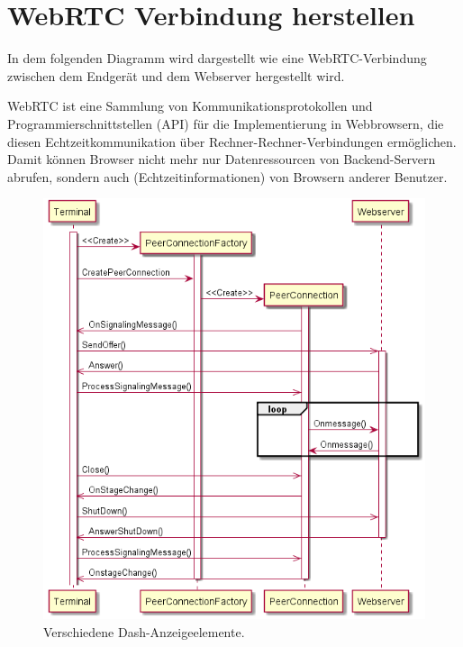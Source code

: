\documentclass[entwurf.tex]{subfiles}
\begin{document}
  	\section{WebRTC Verbindung herstellen}
  	\label{Sequence:WebRTCConnect}
		In dem folgenden Diagramm wird dargestellt wie eine WebRTC-Verbindung zwischen dem Endgerät und dem Webserver hergestellt wird.
		
		WebRTC ist eine Sammlung von Kommunikationsprotokollen und Programmierschnittstellen (API) für die Implementierung in Webbrowsern, die diesen Echtzeitkommunikation über Rechner-Rechner-Verbindungen ermöglichen. Damit können Browser nicht mehr nur Datenressourcen von Backend-Servern abrufen, sondern auch (Echtzeitinformationen) von Browsern anderer Benutzer.
		
		\begin{figure}[H]
			\begin{center}
	 			\includegraphics[width=\textwidth]{diagrams/DataTransferSequenz.png}
  				\caption{Verschiedene Dash-Anzeigeelemente.}
  			\end{center}
  		\end{figure}
  		
  	\newpage
\end{document}
